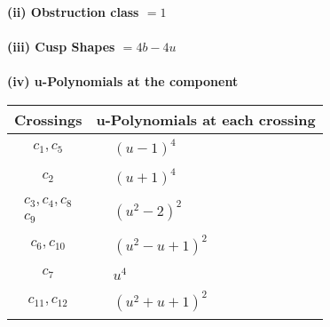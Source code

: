 \documentclass[1p]{elsarticle_modified}
\theoremstyle{definition}
\begin{document}
\flushleft \textbf{(ii) Obstruction class $= 1$}\\~\\
\flushleft \textbf{(iii) Cusp Shapes $= 4 b-4 u$}\\~\\
\newpage\renewcommand{\arraystretch}{1}
\flushleft \textbf{(iv) u-Polynomials at the component}\newline \\
\begin{tabular}{m{50pt}|m{274pt}}
Crossings & \hspace{64pt}u-Polynomials at each crossing \\
\hline $$\begin{aligned}c_{1},c_{5}\end{aligned}$$&$\begin{aligned}
&(u-1)^4
\end{aligned}$\\
\hline $$\begin{aligned}c_{2}\end{aligned}$$&$\begin{aligned}
&(u+1)^4
\end{aligned}$\\
\hline $$\begin{aligned}c_{3},c_{4},c_{8}\\c_{9}\end{aligned}$$&$\begin{aligned}
&(u^2-2)^2
\end{aligned}$\\
\hline $$\begin{aligned}c_{6},c_{10}\end{aligned}$$&$\begin{aligned}
&(u^2- u+1)^2
\end{aligned}$\\
\hline $$\begin{aligned}c_{7}\end{aligned}$$&$\begin{aligned}
&u^4
\end{aligned}$\\
\hline $$\begin{aligned}c_{11},c_{12}\end{aligned}$$&$\begin{aligned}
&(u^2+u+1)^2
\end{aligned}$\\
\hline
\end{tabular}\\~\\
\end{document}
